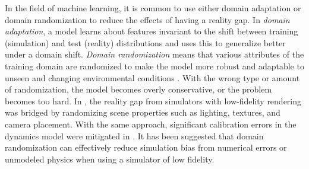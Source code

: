 \documentclass[10pt]{article}
\begin{document}
																				
																																							
																												
																										
																																	 
																										  
																																		
																																	 
									   

In the field of machine learning, it is common to use either 
domain adaptation or domain randomization to reduce the effects of having a reality gap.
In \emph{domain adaptation}, a model learns about features invariant to the shift 
between training (simulation) and test (reality) distributions and uses this to generalize better under a domain shift.
\emph{Domain randomization} means that various attributes of 
the training domain are randomized to make the model more robust and adaptable to unseen and 
changing environmental conditions \cite{muratore2022}. With the wrong type or amount of randomization,
the model becomes overly conservative, or the problem becomes too hard.
In \cite{Tobin2017}, the reality gap from simulators with 
low-fidelity rendering was bridged by randomizing scene properties such as lighting, textures, and
camera placement. With the same approach, significant calibration errors in the dynamics model were mitigated
in \cite{Peng2018}. It has been suggested that domain randomization can effectively reduce 
simulation bias from numerical errors or unmodeled physics
when using a simulator of low fidelity.

																																   
\end{document}
